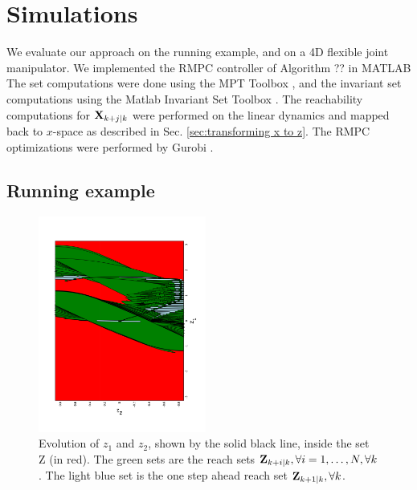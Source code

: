 \section{Simulations}
\label{sec:simulations}

We evaluate our approach on the running example, and on a 4D flexible joint manipulator.
We implemented the RMPC controller of Algorithm ?? in MATLAB
The set computations were done using the MPT Toolbox \cite{MPT3}, and the invariant set computations using the Matlab Invariant Set Toolbox \cite{IST}. 
The reachability computations for $\mathbf{X}_{k+j|k}$ were performed on the linear dynamics and mapped back to $x$-space as described in Sec. \ref{sec:transforming x to z}.
The RMPC optimizations were performed by Gurobi \cite{gurobi}.

\subsection{Running example}

\begin{figure}
\includegraphics[angle=270,width=0.49\textwidth]{figs/z_trajectory_new_2.pdf}
\caption{Evolution of $z_1$ and $z_2$, shown by the solid black line, inside the set Z (in red). The green sets are the reach sets $\mathbf{Z}_{k+i|k},\forall i=1,\dotsc,N, \forall k$. The light blue set is the one step ahead reach set $\mathbf{Z}_{k+1|k},\forall k$.}
\label{fig:z_new_toy}
\end{figure}

